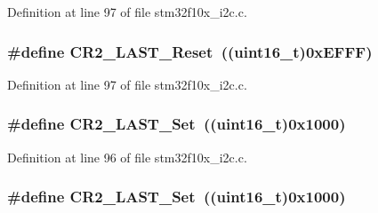 Definition at line 97 of file stm32f10x\+\_\+i2c.\+c.

\subsubsection[{\texorpdfstring{C\+R2\+\_\+\+L\+A\+S\+T\+\_\+\+Reset}{CR2_LAST_Reset}}]{\setlength{\rightskip}{0pt plus 5cm}\#define C\+R2\+\_\+\+L\+A\+S\+T\+\_\+\+Reset~(({\bf uint16\+\_\+t})0x\+E\+F\+F\+F)}\hypertarget{group___i2_c___private___defines_ga904e044226182269485936bad8314f84}{}\label{group___i2_c___private___defines_ga904e044226182269485936bad8314f84}


Definition at line 97 of file stm32f10x\+\_\+i2c.\+c.

\subsubsection[{\texorpdfstring{C\+R2\+\_\+\+L\+A\+S\+T\+\_\+\+Set}{CR2_LAST_Set}}]{\setlength{\rightskip}{0pt plus 5cm}\#define C\+R2\+\_\+\+L\+A\+S\+T\+\_\+\+Set~(({\bf uint16\+\_\+t})0x1000)}\hypertarget{group___i2_c___private___defines_ga3604dd2f23b0f15a088ef6fe9731485a}{}\label{group___i2_c___private___defines_ga3604dd2f23b0f15a088ef6fe9731485a}


Definition at line 96 of file stm32f10x\+\_\+i2c.\+c.

\subsubsection[{\texorpdfstring{C\+R2\+\_\+\+L\+A\+S\+T\+\_\+\+Set}{CR2_LAST_Set}}]{\setlength{\rightskip}{0pt plus 5cm}\#define C\+R2\+\_\+\+L\+A\+S\+T\+\_\+\+Set~(({\bf uint16\+\_\+t})0x1000)}\hypertarget{group___i2_c___private___defines_ga3604dd2f23b0f15a088ef6fe9731485a}{}\label{group___i2_c___private___defines_ga3604dd2f23b0f15a088ef6fe9731485a}


